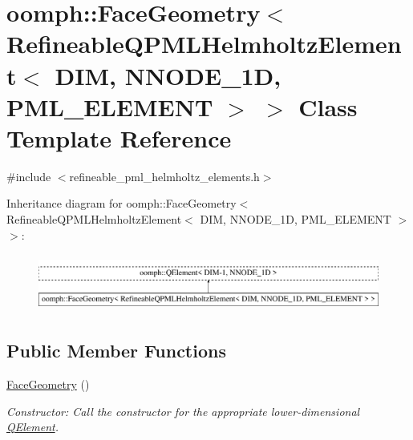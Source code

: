 \hypertarget{classoomph_1_1FaceGeometry_3_01RefineableQPMLHelmholtzElement_3_01DIM_00_01NNODE__1D_00_01PML__ELEMENT_01_4_01_4}{}\section{oomph\+:\+:Face\+Geometry$<$ Refineable\+Q\+P\+M\+L\+Helmholtz\+Element$<$ D\+IM, N\+N\+O\+D\+E\+\_\+1D, P\+M\+L\+\_\+\+E\+L\+E\+M\+E\+NT $>$ $>$ Class Template Reference}
\label{classoomph_1_1FaceGeometry_3_01RefineableQPMLHelmholtzElement_3_01DIM_00_01NNODE__1D_00_01PML__ELEMENT_01_4_01_4}


{\ttfamily \#include $<$refineable\+\_\+pml\+\_\+helmholtz\+\_\+elements.\+h$>$}

Inheritance diagram for oomph\+:\+:Face\+Geometry$<$ Refineable\+Q\+P\+M\+L\+Helmholtz\+Element$<$ D\+IM, N\+N\+O\+D\+E\+\_\+1D, P\+M\+L\+\_\+\+E\+L\+E\+M\+E\+NT $>$ $>$\+:\begin{figure}[H]
\begin{center}
\leavevmode
\includegraphics[height=1.904762cm]{classoomph_1_1FaceGeometry_3_01RefineableQPMLHelmholtzElement_3_01DIM_00_01NNODE__1D_00_01PML__ELEMENT_01_4_01_4}
\end{center}
\end{figure}
\subsection*{Public Member Functions}
\begin{DoxyCompactItemize}
\item 
\hyperlink{classoomph_1_1FaceGeometry_3_01RefineableQPMLHelmholtzElement_3_01DIM_00_01NNODE__1D_00_01PML__ELEMENT_01_4_01_4_ad46c030cf94cf9cabbd95a54bb779826}{Face\+Geometry} ()
\begin{DoxyCompactList}\small\item\em Constructor\+: Call the constructor for the appropriate lower-\/dimensional \hyperlink{classoomph_1_1QElement}{Q\+Element}. \end{DoxyCompactList}\end{DoxyCompactItemize}


